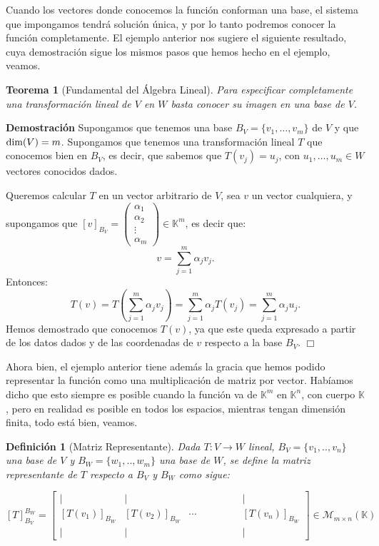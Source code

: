 \documentclass[12pt]{book}
\newtheorem{teo}{Teorema}
\newtheorem{defi}{Definici\'on}
\def\K{\mathbb{K}}
\def\dim{\textup{dim}}
\begin{document}
 
Cuando los vectores donde conocemos la función conforman una base, el sistema que impongamos tendrá solución única, y por lo tanto podremos conocer la función completamente. 
El ejemplo anterior nos sugiere el siguiente resultado, cuya demostración sigue los mismos pasos que hemos hecho en el ejemplo, veamos. 

\begin{teo}[Fundamental del Álgebra Lineal]\label{teo:tfal}
  Para especificar completamente una transformación lineal de $V$ en $W$ basta conocer su imagen en una base de $V$.
\end{teo}
{\bf Demostración}
Supongamos que tenemos una base $B_V=\{v_1,\dots,v_m\}$ de $V$ y que $\dim(V)=m$.
Supongamos que tenemos una transformación lineal $T$ que conocemos bien en $B_V$, es decir, que sabemos que $T(v_j)=u_j$, con $u_1,\dots,u_m\in W$ vectores conocidos dados.

Queremos calcular $T$ en un vector arbitrario de $V$, sea $v$ un vector cualquiera, y supongamos que $[v]_{B_V}=\left(\begin{array}{c}
\alpha_1\\
\alpha_2\\
\vdots\\
\alpha_m
\end{array}\right)\in\K^m$, es decir que:
$$v=\sum_{j=1}^m \alpha_j v_j.$$
Entonces:
$$
T(v)=T\left(\sum_{j=1}^m \alpha_j v_j\right)=\sum_{j=1}^m \alpha_j T(v_j)=\sum_{j=1}^m \alpha_j u_j.
$$
Hemos demostrado que conocemos $T(v)$, ya que este queda expresado a partir de los datos dados y de las coordenadas de $v$ respecto a la base $B_V$.
\hfill $\Box$

Ahora bien, el ejemplo anterior tiene además la gracia que hemos podido representar la función como una multiplicación de matriz por vector.
Habíamos dicho que esto siempre es posible cuando la función va de $\K^m$ en $\K^n$, con cuerpo $\K$, pero en realidad es posible en todos los espacios, mientras tengan dimensión finita, todo está bien, veamos.

\begin{defi}[Matriz Representante]
Dada $T:V\rightarrow W$ lineal, $B_V=\{v_1,..,v_n\}$ una base de $V$ y $B_W=\{w_1,..,w_m\}$ una base de $W$, se define la matriz representante de $T$ respecto a $B_V$ y $B_W$ como sigue:

\[[T]_{B_V}^{B_W}=\left[\begin{array}{cccc}
| & | & \phantom{[T(v_1)]} & |\\
\left[T(v_1)\right]_{B_W} & \left[T(v_2)\right]_{B_W}& \cdots & \left[T(v_n)\right]_{B_W}\\
| & | & & | \end{array}\right]\in\mathcal{M}_{m\times n}(\K)\]
\end{defi}
\end{document}
